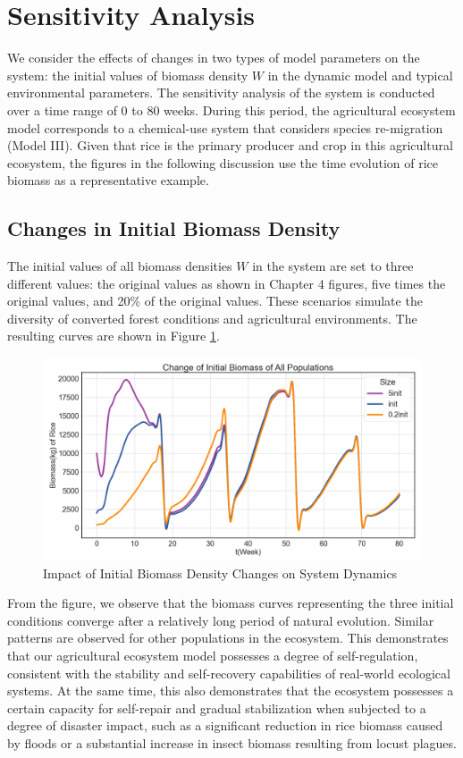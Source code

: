 \documentclass{HZNUMCM}
\begin{document}
  \section{Sensitivity Analysis}
    We consider the effects of changes in two types of model parameters on the system: 
    the initial values of biomass density \( W \) in the dynamic model and typical environmental parameters. 
    The sensitivity analysis of the system is conducted over a time range of 0 to 80 weeks. 
    During this period, the agricultural ecosystem model corresponds to a chemical-use system that considers species re-migration (Model III). 
    Given that rice is the primary producer and crop in this agricultural ecosystem, 
    the figures in the following discussion use the time evolution of rice biomass as a representative example.

    \subsection{Changes in Initial Biomass Density}
      The initial values of all biomass densities \( W \) in the system are set to three different values: 
      the original values as shown in Chapter 4 figures, five times the original values, and 20\% of the original values. 
      These scenarios simulate the diversity of converted forest conditions and agricultural environments. 
      The resulting curves are shown in Figure \ref{fig:Change_init}.

      \begin{figure}[H]
        \centering
        \includegraphics[width=0.75\linewidth]{images/Change_init.png}
        \caption{Impact of Initial Biomass Density Changes on System Dynamics}
        \label{fig:Change_init}
      \end{figure}

      From the figure, we observe that the biomass curves representing the three initial conditions converge after a relatively long period of natural evolution. 
      Similar patterns are observed for other populations in the ecosystem. 
      This demonstrates that our agricultural ecosystem model possesses a degree of self-regulation, 
      consistent with the stability and self-recovery capabilities of real-world ecological systems.
      At the same time, this also demonstrates that the ecosystem possesses a certain capacity for self-repair and gradual stabilization when subjected to a degree of disaster impact, 
      such as a significant reduction in rice biomass caused by floods or a substantial increase in insect biomass resulting from locust plagues. 
\end{document}
